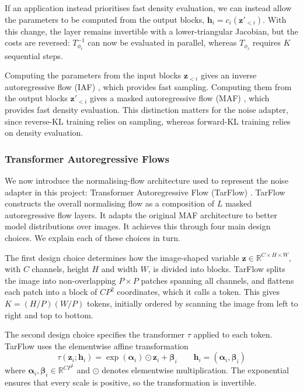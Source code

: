 \documentclass[12pt,a4paper]{report}
\begin{document}
If an application instead prioritises fast density evaluation, we can instead allow the parameters to be computed from the output blocks, $\mathbf{h}_i=c_i(\mathbf{z}'_{<i})$. With this change, the layer remains invertible with a lower-triangular Jacobian, but the costs are reversed: $T_{\phi_\ell}^{-1}$ can now be evaluated in parallel, whereas $T_{\phi_\ell}$ requires $K$ sequential steps.

Computing the parameters from the input blocks $\mathbf{z}_{<i}$ gives an inverse autoregressive flow (IAF) \parencite{kingma2017improvingvariationalinferenceinverse}, which provides fast sampling. Computing them from the output blocks $\mathbf{z}'_{<i}$ gives a masked autoregressive flow (MAF) \parencite{papamakarios2018maskedautoregressiveflowdensity}, which provides fast density evaluation. This distinction matters for the noise adapter, since reverse-KL training relies on sampling, whereas forward-KL training relies on density evaluation.

\subsubsection{Transformer Autoregressive Flows}
\label{subsubsec:transformer_autoregressive_flows}
We now introduce the normalising-flow architecture used to represent
the noise adapter in this project: Transformer Autoregressive Flow
(TarFlow) \parencite{TarFlow}. TarFlow constructs the overall
normalising flow as a composition of $L$ masked autoregressive flow
layers. It adapts the original MAF architecture
\parencite{papamakarios2018maskedautoregressiveflowdensity} to better model distributions over images. It achieves this through four main design
choices. We explain each of these choices in turn.

The first design choice determines how the image-shaped variable $\mathbf{z}\in\mathbb{R}^{C\times H\times W}$, with $C$ channels, height $H$ and width $W$, is divided into blocks. TarFlow splits the image into non-overlapping $P\times P$ patches spanning all channels, and flattens each patch into a block of $CP^2$ coordinates, which it calls a token. This gives $K=(H/P)(W/P)$ tokens, initially ordered by scanning the image from left to right and top to bottom.

The second design choice specifies the transformer $\tau$ applied to
each token. TarFlow uses the elementwise affine transformation
\begin{equation}
\tau\left(\mathbf{z}_i;\mathbf{h}_i\right)
=
\exp\left(\boldsymbol{\alpha}_i\right)
\odot
\mathbf{z}_i
+
\boldsymbol{\beta}_i
\qquad
\mathbf{h}_i
=
\left(
\boldsymbol{\alpha}_i,
\boldsymbol{\beta}_i
\right)
\label{eq:tarflow_affine_transformer}
\end{equation}
where
$\boldsymbol{\alpha}_i,\boldsymbol{\beta}_i
\in\mathbb{R}^{CP^2}$ and $\odot$ denotes elementwise multiplication.
The exponential ensures that every scale is positive, so the
transformation is invertible.
\end{document}
